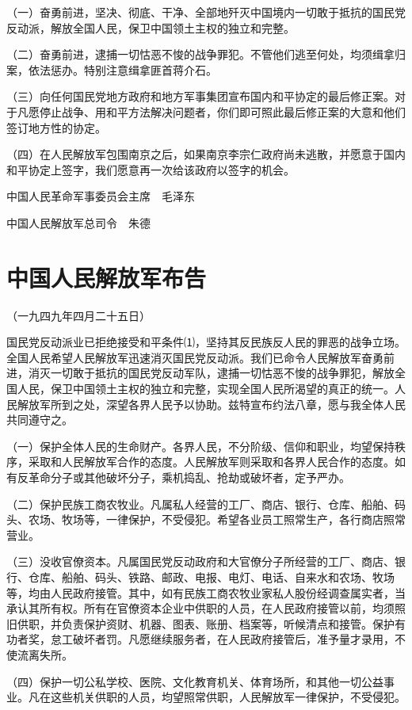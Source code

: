 \documentclass[UTF-8, a5paper, 12pt]{ctexart}
\begin{document}
（一）奋勇前进，坚决、彻底、干净、全部地歼灭中国境内一切敢于抵抗的国民党反动派，解放全国人民，保卫中国领土主权的独立和完整。

（二）奋勇前进，逮捕一切怙恶不悛的战争罪犯。不管他们逃至何处，均须缉拿归案，依法惩办。特别注意缉拿匪首蒋介石。

（三）向任何国民党地方政府和地方军事集团宣布国内和平协定的最后修正案。对于凡愿停止战争、用和平方法解决问题者，你们即可照此最后修正案的大意和他们签订地方性的协定。

（四）在人民解放军包围南京之后，如果南京李宗仁政府尚未逃散，并愿意于国内和平协定上签字，我们愿意再一次给该政府以签字的机会。

中国人民革命军事委员会主席　毛泽东

中国人民解放军总司令　朱德

\section{中国人民解放军布告}

（一九四九年四月二十五日）

国民党反动派业已拒绝接受和平条件⑴，坚持其反民族反人民的罪恶的战争立场。全国人民希望人民解放军迅速消灭国民党反动派。我们已命令人民解放军奋勇前进，消灭一切敢于抵抗的国民党反动军队，逮捕一切怙恶不悛的战争罪犯，解放全国人民，保卫中国领土主权的独立和完整，实现全国人民所渴望的真正的统一。人民解放军所到之处，深望各界人民予以协助。兹特宣布约法八章，愿与我全体人民共同遵守之。

（一）保护全体人民的生命财产。各界人民，不分阶级、信仰和职业，均望保持秩序，采取和人民解放军合作的态度。人民解放军则采取和各界人民合作的态度。如有反革命分子或其他破坏分子，乘机捣乱、抢劫或破坏者，定予严办。

（二）保护民族工商农牧业。凡属私人经营的工厂、商店、银行、仓库、船舶、码头、农场、牧场等，一律保护，不受侵犯。希望各业员工照常生产，各行商店照常营业。

（三）没收官僚资本。凡属国民党反动政府和大官僚分子所经营的工厂、商店、银行、仓库、船舶、码头、铁路、邮政、电报、电灯、电话、自来水和农场、牧场等，均由人民政府接管。其中，如有民族工商农牧业家私人股份经调查属实者，当承认其所有权。所有在官僚资本企业中供职的人员，在人民政府接管以前，均须照旧供职，并负责保护资财、机器、图表、账册、档案等，听候清点和接管。保护有功者奖，怠工破坏者罚。凡愿继续服务者，在人民政府接管后，准予量才录用，不使流离失所。

（四）保护一切公私学校、医院、文化教育机关、体育场所，和其他一切公益事业。凡在这些机关供职的人员，均望照常供职，人民解放军一律保护，不受侵犯。
\end{document}
